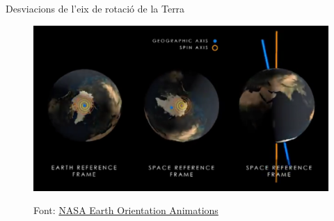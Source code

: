 \documentclass{beamer} %
\begin{document}
\begin{frame}{Desviacions de l'eix de rotació de la Terra}
\begin{minipage}{0.49\textwidth}
\begin{itemize}
    \end{itemize}
    \vspace{1cm}
    \begin{figure}
      \centering
      \href{https://youtu.be/KnPk2T_kpco}{
        \includegraphics[width=\textwidth, keepaspectratio]{../Images/polarMotion_video_frame.png}
      }
      \vspace{-0.5cm}
      \caption{\tiny Font: \href{https://svs.gsfc.nasa.gov/20196}{NASA Earth Orientation Animations}}
    \end{figure}
  \end{minipage}
\end{frame}

\end{document}
